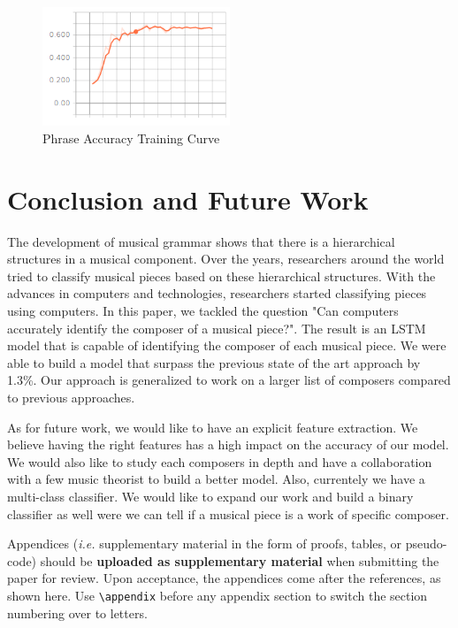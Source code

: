 \documentclass[11pt,a4paper]{article}
\begin{document}
\begin{figure}[h]
\caption{Phrase Accuracy Training Curve}
\centering
\includegraphics[width=0.5\textwidth]{vaccuracy.png}
\end{figure}


\section{Conclusion and Future Work}

The development of musical grammar shows that there is a hierarchical structures in a musical component. Over the years, researchers around the world tried to classify musical pieces based on these hierarchical structures. With the advances in computers and technologies, researchers started classifying pieces using computers. In this paper, we tackled the question "Can computers accurately identify the composer of a musical piece?". The result is an LSTM model that is capable of identifying the composer of each musical piece. We were able to build a model that surpass the previous state of the art approach by 1.3\%. Our approach is generalized to work on a larger list of composers compared to previous approaches. 

As for future work, we would like to have an explicit feature extraction. We believe having the right features has a high impact on the accuracy of our model. We would also like to study each composers in depth and have a collaboration with a few music theorist to build a better model. Also, currentely we have a multi-class classifier. We would like to expand our work and build a binary classifier as well were we can tell if a musical piece is a work of specific composer. 






\appendix



Appendices ({\em i.e.} supplementary material in the form of proofs, tables,
or pseudo-code) should be {\bf uploaded as supplementary material} when submitting the paper for review.
Upon acceptance, the appendices come after the references, as shown here. Use
\verb|\appendix| before any appendix section to switch the section
numbering over to letters.
\end{document}
